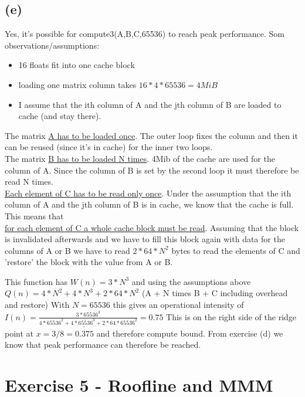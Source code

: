 \documentclass[10pt,a4paper,oneside,notitlepage]{report}
\begin{document}
\subsection*{(e)}
Yes, it's possible for compute3(A,B,C,65536) to reach peak performance. 
Som observations/assumptions:
\begin{itemize}
\item 16 floats fit into one cache block
\item loading one matrix column takes $16*4*65536=4MiB$
\item I assume that the ith column of A and the jth column of B are loaded to cache (and stay there).
\end{itemize}
The matrix \underline{A has to be loaded once}. The outer loop fixes the column and then it can be reused (since it's in cache) for the inner two loops.\\ The matrix \underline{B has to be loaded N times}. 4Mib of the cache are used for the column of A. Since the column of B is set by the second loop it must therefore be read N times. \\
\underline{Each element of C has to be read only once}. Under the assumption that the ith column of A and the jth column of B is in cache, we know that the cache is full. This means that\\ \underline{for each element of C a whole cache block must be read}. Assuming that the block is invalidated afterwards and we have to fill this block again with data for the columns of A or B we have to read $2*64*N^2$ bytes to read the elements of C and 'restore' the block with the value from A or B.

This function has $W(n)=3*N^3$ and using the assumptions above\\ $Q(n)=4*N^2+4*N^3+2*64*N^2$ (A + N times B + C including overhead and restore) With $N=65536$ this gives an operational intensity of $\underline{I(n)=\frac{3*65536^3}{4*65536^2+4*65536^3+2*64*65536^2}=0.75}$
This is on the right side of the ridge point at $x=3/8=0.375$ and therefore compute bound. From exercise (d) we know that peak performance can therefore be reached.

\section*{Exercise 5 - Roofline and MMM}
\end{document}

